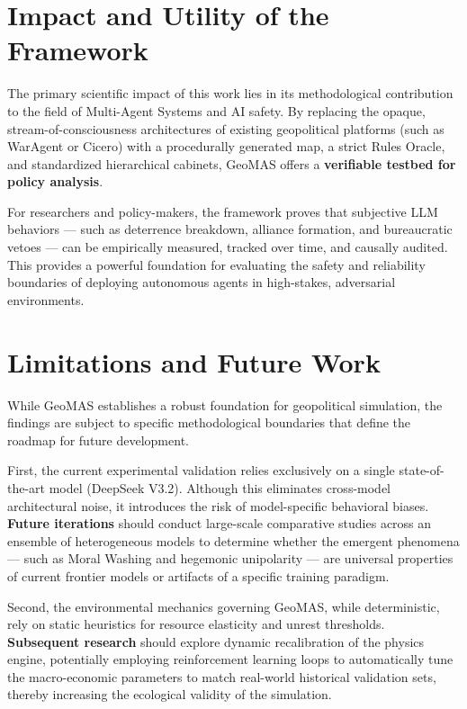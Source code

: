 \begin{enumerate}
\section{Impact and Utility of the Framework}
The primary scientific impact of this work lies in its methodological contribution to the field of Multi-Agent Systems and AI safety. By replacing the opaque, stream-of-consciousness architectures of existing geopolitical platforms (such as WarAgent or Cicero) with a procedurally generated map, a strict Rules Oracle, and standardized hierarchical cabinets, GeoMAS offers a \textbf{verifiable testbed for policy analysis}. 

For researchers and policy-makers, the framework proves that subjective LLM behaviors — such as deterrence breakdown, alliance formation, and bureaucratic vetoes — can be empirically measured, tracked over time, and causally audited. This provides a powerful foundation for evaluating the safety and reliability boundaries of deploying autonomous agents in high-stakes, adversarial environments.

\section{Limitations and Future Work}
While GeoMAS establishes a robust foundation for geopolitical simulation, the findings are subject to specific methodological boundaries that define the roadmap for future development.

First, the current experimental validation relies exclusively on a single state-of-the-art model (DeepSeek V3.2). Although this eliminates cross-model architectural noise, it introduces the risk of model-specific behavioral biases. \textbf{Future iterations} should conduct large-scale comparative studies across an ensemble of heterogeneous models to determine whether the emergent phenomena — such as Moral Washing and hegemonic unipolarity — are universal properties of current frontier models or artifacts of a specific training paradigm.

Second, the environmental mechanics governing GeoMAS, while deterministic, rely on static heuristics for resource elasticity and unrest thresholds. \textbf{Subsequent research} should explore dynamic recalibration of the physics engine, potentially employing reinforcement learning loops to automatically tune the macro-economic parameters to match real-world historical validation sets, thereby increasing the ecological validity of the simulation.


\end{enumerate}

